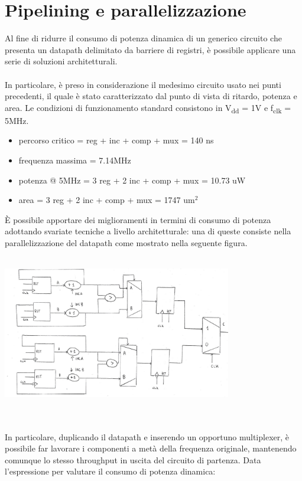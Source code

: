 \documentclass[11pt,  english, makeidx, a4paper, titlepage, oneside]{book}
\begin{document}
\section{Pipelining e parallelizzazione}
Al fine di ridurre il consumo di potenza dinamica di un generico circuito che presenta un datapath delimitato da barriere di registri, è possibile applicare una serie di soluzioni architetturali.
\\\\
In particolare, è preso in considerazione il medesimo circuito usato nei punti precedenti, il quale è stato caratterizzato dal punto di vista di ritardo, potenza e area.
Le condizioni di funzionamento standard consistono in V\textsubscript{dd} = 1V e f\textsubscript{clk} = 5MHz.
\begin{itemize}
\item percorso critico = reg + inc + comp + mux = 140 ns
\item frequenza massima = 7.14MHz
\item potenza @ 5MHz = 3 reg + 2 inc + comp + mux = 10.73 uW
\item area = 3 reg + 2 inc + comp + mux = 1747 um$^2$
\end{itemize}
\vspace{0.3cm}
È possibile apportare dei miglioramenti in termini di consumo di potenza adottando svariate tecniche a livello architetturale: una di queste consiste nella parallelizzazione del datapath come mostrato nella seguente figura.
\\\\
\centerline{\includegraphics[width=10cm]{./img/Lab_3/datapath_parallelo.jpg}}
\\\\
In particolare, duplicando il datapath e inserendo un opportuno multiplexer, è possibile far lavorare i componenti a metà della frequenza originale, mantenendo comunque lo stesso throughput in uscita del circuito di partenza. Data l'espressione per valutare il consumo di potenza dinamica:
\end{document}
